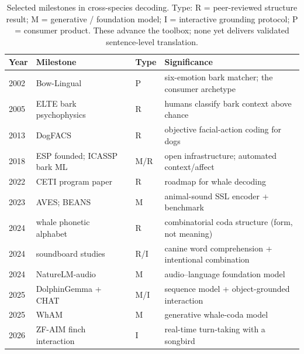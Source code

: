 \begin{table}[htbp]
\centering
\caption{Selected milestones in cross-species decoding. Type: R =
peer-reviewed structure result; M = generative / foundation model; I =
interactive grounding protocol; P = consumer product. These advance the
toolbox; none yet delivers validated sentence-level translation.}
\label{tab:milestones}
\footnotesize
\setlength{\tabcolsep}{4pt}
\begin{tabular}{@{}p{1.0cm}p{4.6cm}p{0.9cm}p{5.5cm}@{}}
\toprule
\textbf{Year} & \textbf{Milestone} & \textbf{Type} & \textbf{Significance} \\
\midrule
2002 & Bow-Lingual~\cite{bowlingual2002} & P & six-emotion bark matcher; the consumer archetype \\
2005 & ELTE bark psychophysics~\cite{pongracz2005barks} & R & humans classify bark context above chance \\
2013 & DogFACS~\cite{waller2013dogfacs} & R & objective facial-action coding for dogs \\
2018 & ESP founded; ICASSP bark ML~\cite{icassp2018dogbark} & M/R & open infrastructure; automated context/affect \\
2022 & CETI program paper~\cite{andreas2022ceti} & R & roadmap for whale decoding \\
2023 & AVES; BEANS~\cite{hagiwara2023aves,hagiwara2023beans} & M & animal-sound SSL encoder + benchmark \\
2024 & whale phonetic alphabet~\cite{sharma2024whale} & R & combinatorial coda structure (form, not meaning) \\
2024 & soundboard studies~\cite{bastos2024plos,bastos2024scirep} & R/I & canine word comprehension + intentional combination \\
2024 & NatureLM-audio~\cite{robinson2024naturelm} & M & audio--language foundation model \\
2025 & DolphinGemma + CHAT~\cite{google2025dolphingemma} & M/I & sequence model + object-grounded interaction \\
2025 & WhAM~\cite{wham2025} & M & generative whale-coda model \\
2026 & ZF-AIM finch interaction~\cite{esp2026finch} & I & real-time turn-taking with a songbird \\
\bottomrule
\end{tabular}
\end{table}
